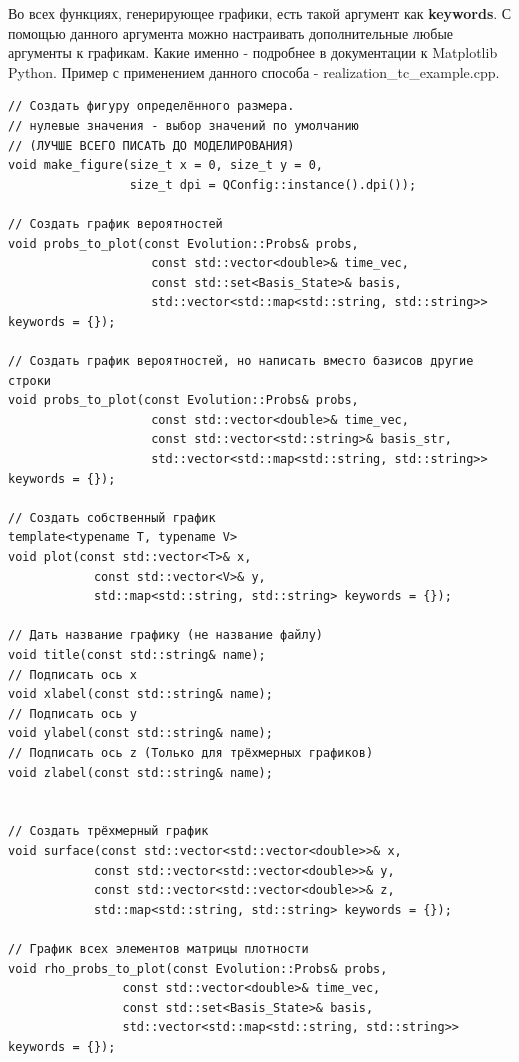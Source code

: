 \documentclass[12pt,fleqn]{article}
\begin{document}
    Во всех функциях, генерирующее графики, есть такой аргумент как \textbf{keywords}. С помощью данного аргумента можно настраивать дополнительные любые аргументы к графикам. Какие именно - подробнее 
    в документации к \textsf{Matplotlib} Python. Пример с применением данного способа - \textsf{realization\_tc\_example.cpp}.
\begin{mdframed}[linecolor=black, topline=true, bottomline=true,
    leftline=false, rightline=false]
\begin{verbatim}
// Создать фигуру определённого размера.
// нулевые значения - выбор значений по умолчанию
// (ЛУЧШЕ ВСЕГО ПИСАТЬ ДО МОДЕЛИРОВАНИЯ)
void make_figure(size_t x = 0, size_t y = 0,
                 size_t dpi = QConfig::instance().dpi());

// Создать график вероятностей
void probs_to_plot(const Evolution::Probs& probs,
                    const std::vector<double>& time_vec,
                    const std::set<Basis_State>& basis,
                    std::vector<std::map<std::string, std::string>> keywords = {});

// Создать график вероятностей, но написать вместо базисов другие строки
void probs_to_plot(const Evolution::Probs& probs,
                    const std::vector<double>& time_vec,
                    const std::vector<std::string>& basis_str,
                    std::vector<std::map<std::string, std::string>> keywords = {});

// Создать собственный график
template<typename T, typename V>
void plot(const std::vector<T>& x,
            const std::vector<V>& y,
            std::map<std::string, std::string> keywords = {});

// Дать название графику (не название файлу)
void title(const std::string& name);
// Подписать ось x
void xlabel(const std::string& name);
// Подписать ось y
void ylabel(const std::string& name);
// Подписать ось z (Только для трёхмерных графиков)
void zlabel(const std::string& name);


// Создать трёхмерный график
void surface(const std::vector<std::vector<double>>& x,
            const std::vector<std::vector<double>>& y,
            const std::vector<std::vector<double>>& z,
            std::map<std::string, std::string> keywords = {});

// График всех элементов матрицы плотности 
void rho_probs_to_plot(const Evolution::Probs& probs,
                const std::vector<double>& time_vec,
                const std::set<Basis_State>& basis,
                std::vector<std::map<std::string, std::string>> keywords = {});


\end{verbatim}
\end{mdframed}
\end{document}
